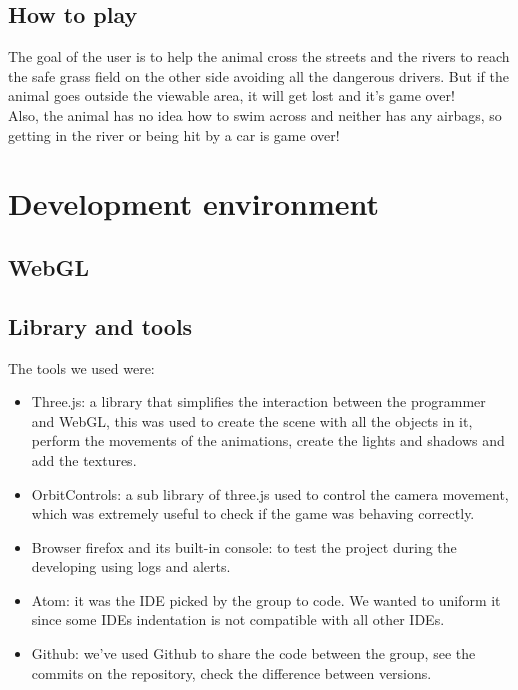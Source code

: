 \documentclass[a4paper, 11pt]{article}
\begin{document}
\subsection{How to play}
The goal of the user is to help the animal cross the streets and the rivers to reach the safe grass field on the other side avoiding all the dangerous drivers. But if the animal goes outside the viewable area, it will get lost and it's game over!\\
Also, the animal has no idea how to swim across and neither has any airbags, so getting in the river or being hit by a car is game over!

\section{Development environment}
\subsection{WebGL}
\subsection{Library and tools}
The tools we used were:
\begin{itemize}
\item Three.js: a library that simplifies the interaction between the programmer and WebGL, this was used to create the scene with all the objects in it, perform the movements of the animations, create the lights and shadows and add the textures.
\item OrbitControls: a sub library of three.js used to control the camera movement, which was extremely useful to check if the game was behaving correctly.
\item Browser firefox and its built-in console: to test the project during the developing using logs and alerts.
\item Atom: it was the IDE picked by the group to code. We wanted to uniform it since some IDEs indentation is not compatible with all other IDEs.
\item Github: we've used Github to share the code between the group, see the commits on the repository, check the difference between versions.
\end{itemize}
\newpage
\end{document}
